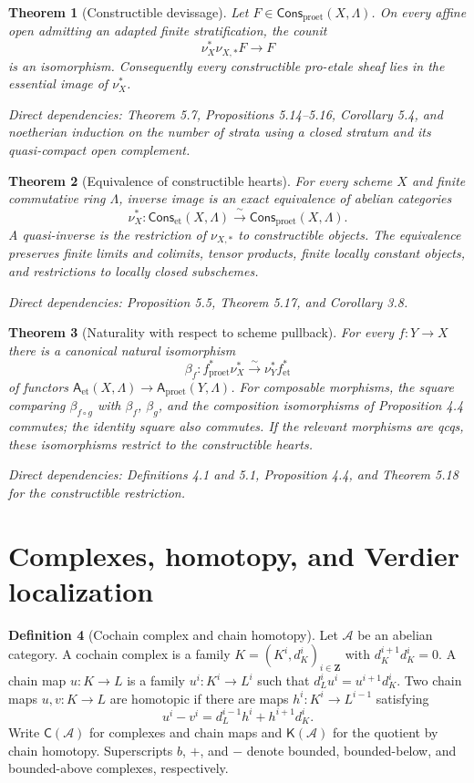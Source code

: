 \documentclass[10pt]{article}
\newtheorem{theorem}{Theorem}[section]
\theoremstyle{definition}
\newtheorem{definition}[theorem]{Definition}
\newcommand{\Lam}{\Lambda}
\newcommand{\Cpx}{\mathsf{C}}
\newcommand{\Kcat}{\mathsf{K}}
\newcommand{\Cons}{\mathsf{Cons}}
\newcommand{\et}{\mathrm{et}}
\newcommand{\proet}{\mathrm{proet}}
\newcommand{\dep}[1]{\par\smallskip\noindent\textit{Direct dependencies: #1}}
\begin{document}
\begin{theorem}[Constructible devissage]
Let $F\in\Cons_\proet(X,\Lam)$.  On every affine open admitting an adapted
finite stratification, the counit
\[
\nu_X^*\nu_{X,*}F\longrightarrow F
\]
is an isomorphism.  Consequently every constructible pro-etale sheaf lies in
the essential image of $\nu_X^*$.
\dep{Theorem 5.7, Propositions 5.14--5.16, Corollary 5.4, and noetherian
induction on the number of strata using a closed stratum and its
quasi-compact open complement.}
\end{theorem}

\begin{theorem}[Equivalence of constructible hearts]
For every scheme $X$ and finite commutative ring $\Lam$, inverse image is an
exact equivalence of abelian categories
\[
\nu_X^*: \Cons_\et(X,\Lam)
\xrightarrow{\ \sim\ }\Cons_\proet(X,\Lam).
\]
A quasi-inverse is the restriction of $\nu_{X,*}$ to constructible objects.
The equivalence preserves finite limits and colimits, tensor products, finite
locally constant objects, and restrictions to locally closed subschemes.
\dep{Proposition 5.5, Theorem 5.17, and Corollary 3.8.}
\end{theorem}

\begin{theorem}[Naturality with respect to scheme pullback]
For every $f:Y\to X$ there is a canonical natural isomorphism
\[
\beta_f:f_\proet^*\nu_X^*\xrightarrow{\sim}
\nu_Y^*f_\et^*
\]
of functors $\mathsf A_\et(X,\Lam)\to\mathsf A_\proet(Y,\Lam)$.
For composable morphisms, the square comparing $\beta_{f\circ g}$ with
$\beta_f$, $\beta_g$, and the composition isomorphisms of Proposition 4.4
commutes; the identity square also commutes.  If the relevant morphisms are
qcqs, these isomorphisms restrict to the constructible hearts.
\dep{Definitions 4.1 and 5.1, Proposition 4.4, and Theorem 5.18 for the
constructible restriction.}
\end{theorem}

\section{Complexes, homotopy, and Verdier localization}

\begin{definition}[Cochain complex and chain homotopy]
Let $\mathcal A$ be an abelian category.  A cochain complex is a family
$K=(K^i,d_K^i)_{i\in\mathbf Z}$ with
$d_K^{i+1}d_K^i=0$.  A chain map $u:K\to L$ is a family $u^i:K^i\to L^i$
such that $d_L^iu^i=u^{i+1}d_K^i$.  Two chain maps $u,v:K\to L$ are homotopic
if there are maps $h^i:K^i\to L^{i-1}$ satisfying
\[
u^i-v^i=d_L^{i-1}h^i+h^{i+1}d_K^i.
\]
Write $\Cpx(\mathcal A)$ for complexes and chain maps and
$\Kcat(\mathcal A)$ for the quotient by chain homotopy.  Superscripts $b$,
$+$, and $-$ denote bounded, bounded-below, and bounded-above complexes,
respectively.
\end{definition}
\end{document}
